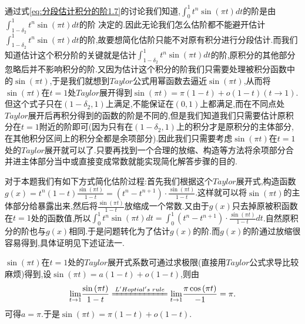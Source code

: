 \documentclass[lang=cn,newtx,10pt,scheme=chinese]{elegantbook}
\begin{document}
\begin{note}
通过式\ref{eq:分段估计积分的阶1.7}的讨论我们知道,$\int_0^1{t^n\sin \left( \pi t \right) dt}$的阶是由$\int_{1-\delta_2}^1{t^n\sin \left( \pi t \right) dt}$的阶
决定的.因此无论我们怎么估阶都不能避开估计$\int_{1-\delta_2}^1{t^n\sin \left( \pi t \right) dt}$的阶,故要想简化估阶只能不对原有积分进行分段估计.而我们知道估计这个积分阶的关键就是估计$\int_{1-\delta_2}^1{t^n\sin \left( \pi t \right) dt}$的阶,原积分的其他部分忽略后并不影响积分的阶.又因为估计这个积分的阶我们只需要处理被积分函数中的$\sin(\pi t)$,于是我们就想到$Taylor$公式用幂函数去逼近$\sin(\pi t)$,从而将$\sin(\pi t)$在$t=1$处$Taylor$展开得到$\sin \left( \pi t \right) =\pi\left( 1-t \right) +o\left( 1-t \right)$$(t\to 1)$.但这个式子只在$(1-\delta_2,1)$上满足,不能保证在$(0,1)$上都满足,而在不同点处$Taylor$展开后再积分得到的函数的阶是不同的,但是我们知道我们只需要估计原积分在$t=1$附近的阶即可(因为只有在$(1-\delta_2,1)$上的积分才是原积分的主体部分,在其他积分区间上的积分全都是余项部分).因此我们只需要考虑$\sin(\pi t)$在$t=1$处的$Taylor$展开就可以了.只要再找到一个合理的放缩、构造等方法将余项部分合并进主体部分当中或直接变成常数就能实现简化解答步骤的目的.

对于本题我们有如下方式简化估阶过程:首先我们根据这个$Taylor$展开式,构造函数$g\left( x \right) =t^n\left( 1-t \right) \frac{\sin \left( \pi t \right)}{1-t}=\left( t^n-t^{n+1} \right) \cdot \frac{\sin \left( \pi t \right)}{1-t}$.这样就可以将$\sin(\pi t)$的主体部分给暴露出来,然后将$\frac{\sin(\pi t)}{1-t}$放缩成一个常数.又由于$g(x)$只去掉原被积函数在$t=1$处的函数值,所以$\int_0^1{t^n\sin \left( \pi t \right) dt}=\int_0^1{\left( t^n-t^{n+1} \right) \cdot \frac{\sin \left( \pi t \right)}{1-t}dt}$.自然原积分的阶也与$g(x)$相同.于是问题转化为了估计$g(x)$的阶.而$g(x)$的阶通过放缩很容易得到,具体证明见下述证法一.
\end{note}
\begin{remark}
$\sin(\pi t)$在$t=1$处的$Taylor$展开式系数可通过求极限(直接用$Taylor$公式求导比较麻烦)得到,设$\sin \left( \pi t \right) =a\left( 1-t \right) +o\left( 1-t \right)$,则由
\begin{align*}
  \underset{t\rightarrow 1}{\lim}\frac{\sin \left( \pi t \right)}{1-t}\xlongequal[]{L'Hoptial's\,\,rule}\underset{t\rightarrow 1}{\lim}\frac{\pi \cos \left( \pi t \right)}{-1}=\pi.
\end{align*} 
可得$a=\pi$.于是$\sin \left( \pi t \right) =\pi\left( 1-t \right) +o\left( 1-t \right)$.
\end{remark}
\end{document}
